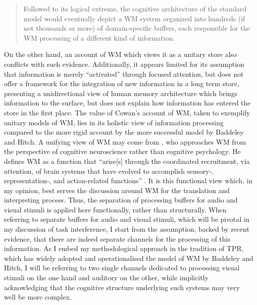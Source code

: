 \begin{quote}
Followed to its logical extreme, the cognitive architecture of the standard model would eventually depict a WM system organized into hundreds (if not thousands or more) of domain-specific buffers, each responsible for the WM processing of a different kind of information.\hfill\hbox{\citep[25]{postle_working_2006}}
\end{quote}
On the other hand, an account of WM which views it as a unitary store also conflicts with such evidence. Additionally, it appears limited for its assumption that information is merely ``activated'' through focused attention, but does not offer a framework for the integration of new information in a long term store, presenting a unidirectional view of human memory architecture which brings information to the surface, but does not explain how information has entered the store in the first place. The value of Cowan's account of WM, taken to exemplify unitary models of WM, lies in its holistic view of information processing compared to the more rigid account by the more successful model by Baddeley and Hitch. A unifying view of WM may come from \citet{postle_working_2006}, who approaches WM from the perspective of cognitive neuroscience rather than cognitive psychology. He defines WM as a function that ``arise[s] through the coordinated recruitment, via attention, of brain systems that have evolved to accomplish sensory-, representation-, and action-related functions'' \citep[23]{postle_working_2006}. It is this functional view which, in my opinion, best serves the discussion around WM for the translation and interpreting process. Thus, the separation of processing buffers for audio and visual stimuli is applied here functionally, rather than structurally. When referring to separate buffers for audio and visual stimuli, which will be pivotal in my discussion of task interference, I start from the assumption, backed by recent evidence, that there are indeed separate channels for the processing of this information. As I embed my methodological approach in the tradition of TPR, which has widely adopted and operationalised the model of WM by Baddeley and Hitch, I will be referring to two single channels dedicated to processing visual stimuli on the one hand and auditory on the other, while implicitly acknowledging that the cognitive structure underlying such systems may very well be more complex.

